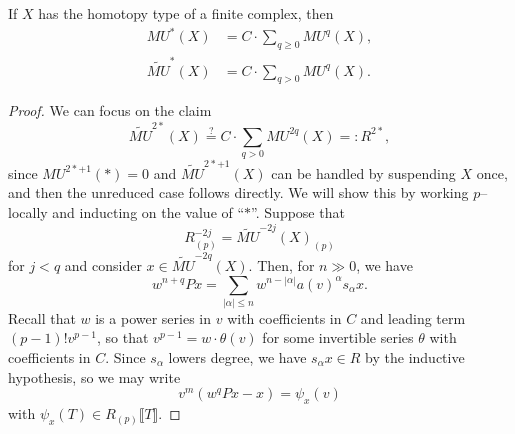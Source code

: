 \begin{theorem}
If $X$ has the homotopy type of a finite complex, then
\begin{align*}
MU^*(X) & = C \cdot \sum_{q \ge 0} MU^q(X), \\
\widetilde{MU}^*(X) & = C \cdot \sum_{q > 0} MU^q(X).
\end{align*}
\end{theorem}
\begin{proof}
We can focus on the claim \[\widetilde{MU}^{2*}(X) \stackrel{?}{=} C \cdot \sum_{q > 0} MU^{2q}(X) =: R^{2*},\] since $MU^{2*+1}(*) = 0$ and $\widetilde{MU}^{2*+1}(X)$ can be handled by suspending $X$ once, and then the unreduced case follows directly.  We will show this by working $p$--locally and inducting on the value of ``$*$''.  Suppose that \[R^{-2j}_{(p)} = \widetilde{MU}^{-2j}(X)_{(p)}\] for $j < q$ and consider $x \in \widetilde{MU}^{-2q}(X)$.  Then, for $n \gg 0$, we have \[w^{n+q} P x = \sum_{|\alpha| \le n} w^{n - |\alpha|} a(v)^\alpha s_\alpha x.\]  Recall that $w$ is a power series in $v$ with coefficients in $C$ and leading term $(p-1)! v^{p-1}$, so that $v^{p-1} = w \cdot \theta(v)$ for some invertible series $\theta$ with coefficients in $C$.  Since $s_\alpha$ lowers degree, we have $s_\alpha x \in R$ by the inductive hypothesis, so we may write \[v^m(w^qPx - x) = \psi_x(v)\] with $\psi_x(T) \in R_{(p)}\llbracket T \rrbracket$.


\end{proof}
